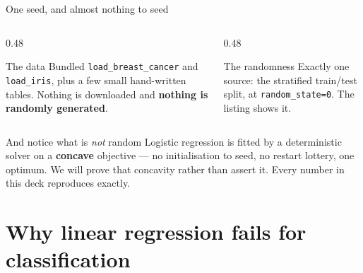 \documentclass[aspectratio=169]{beamer}
\begin{document}
\begin{frame}{One seed, and almost nothing to seed}
  \begin{columns}[T]
    \begin{column}{0.48\textwidth}
      \begin{block}{The data}
        \small Bundled \texttt{load\_breast\_cancer} and \texttt{load\_iris},
        plus a few small hand-written tables. Nothing is downloaded and
        \textbf{nothing is randomly generated}.
      \end{block}
    \end{column}
    \begin{column}{0.48\textwidth}
      \begin{block}{The randomness}
        \small Exactly one source: the stratified train/test split, at
        \texttt{random\_state=0}. The listing shows it.
      \end{block}
    \end{column}
  \end{columns}
  \vspace{0.4em}
  \begin{exampleblock}{And notice what is \emph{not} random}
    \centering\small
    Logistic regression is fitted by a deterministic solver on a
    \textbf{concave} objective --- no initialisation to seed, no restart
    lottery, one optimum. We will prove that concavity rather than assert it.
    Every number in this deck reproduces exactly.
  \end{exampleblock}
\end{frame}

\section[Line fails]{Why linear regression fails for classification}
\label{sec:why}
\end{document}
